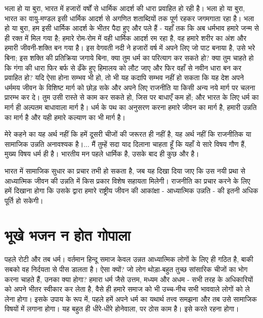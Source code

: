 भला हो या बुरा, भारत में हजारों वर्षों से धार्मिक आदर्श की धारा प्रवाहित हो रही है। भला हो या बुरा, भारत का वायु-मण्डल इसी धार्मिक आदर्श से अगणित शताब्दियों तक पूर्ण रहकर जगमगाता रहा है। भला हो या बुरा, हम इसी धार्मिक आदर्श के भीतर पैदा हुए और पले हैं - यहाँ तक कि अब धर्मभाव हमारे जन्म से ही रक्त में मिल गया है; हमारे रोम-रोम में वही धार्मिक आदर्श रम रहा है, वह हमारे शरीर का अंश और हमारी जीवनी-शक्ति बन गया है। इस वेगवती नदी ने हजारों वर्ष में अपने लिए जो पाट बनाया है, उसे भरे बिना; इस शक्ति की प्रतिक्रिया जगाये बिना, क्या तुम धर्म का परित्याग कर सकते हो? क्या तुम चाहते हो कि गंगा की धारा फिर बर्फ से ढँके हुए हिमालय को लौट जाए और फिर वहाँ से नवीन धारा बन कर प्रवाहित हो? यदि ऐसा होना सम्भव भी हो, तो भी यह कदापि सम्भव नहीं हो सकता कि यह देश अपने धर्ममय जीवन के विशिष्ट मार्ग को छोड़ सके और अपने लिए राजनीति या किसी अन्य नये मार्ग पर चलना प्रारम्भ कर दे। तुम उसी रास्ते से काम कर सकते हो, जिस पर बाधाएँ कम हों; और भारत के लिए धर्म का मार्ग ही अल्पतम बाधावाला मार्ग है। धर्म के पथ का अनुसरण करना हमारे जीवन का मार्ग है, हमारी उन्नति का मार्ग है और यही हमारे कल्याण का भी मार्ग है। 

मेरे कहने का यह अर्थ नहीं कि हमें दूसरी चीजों की जरूरत ही नहीं है, यह अर्थ नहीं कि राजनीतिक या सामाजिक उन्नति अनावश्यक है।... मैं तुम्हें सदा याद दिलाना चाहता हूँ कि यहाँ ये सारे विषय गौण हैं, मुख्य विषय धर्म ही है। भारतीय मन पहले धार्मिक है, उसके बाद ही कुछ और है। 

भारत में सामाजिक सुधार का प्रचार तभी हो सकता है, जब यह दिखा दिया जाए कि उस नयी प्रथा से आध्यात्मिक जीवन की उन्नति में किस प्रकार विशेष सहायता मिलेगी। राजनीति का प्रचार करने के लिए हमें दिखाना होगा कि उसके द्वारा हमारे राष्ट्रीय जीवन की आकांक्षा - आध्यात्मिक उन्नति - की इतनी अधिक पूर्ति हो सकेगी।


\section*{भूखे भजन न होत गोपाला}


पहले रोटी और तब धर्म। वर्तमान हिन्दू समाज केवल उन्नत आध्यात्मिक लोगों के लिए ही गठित है, बाकी सबको वह निर्दयता से पीस डालता है। ऐसा क्यों? जो लोग थोड़ा-बहुत तुच्छ सांसारिक चीजों का भोग करना चाहते हैं, उनका क्या होगा? हमारा धर्म जैसे उत्तम, मध्यम और अधम - सभी तरह के अधिकारियों को अपने भीतर स्वीकार कर लेता है, वैसे ही हमारे समाज को भी उच्च-नीच सभी भाववाले लोगों को ले लेना होगा। इसके उपाय के रूप में, पहले हमें अपने धर्म का यथार्थ तत्त्व समझना और तब उसे सामाजिक विषयों में लगाना होगा। यह बहुत ही धीरे-धीरे होनेवाला, पर ठोस काम है। इसे करते रहना होगा। 

